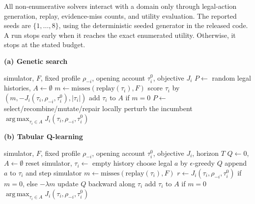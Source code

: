 \documentclass[10pt]{article}
\newcommand{\argmax}{\operatorname*{arg\,max}}
\begin{document}
All non-enumerative solvers interact with a domain only through legal-action
generation, replay, evidence-miss counts, and utility evaluation. The reported
seeds are $\{1,\ldots,8\}$, using the deterministic seeded generator in the
released code. A run stops early when it reaches the exact enumerated utility.
Otherwise, it stops at the stated budget.

\begin{algorithm}[htbp]
\caption{Replay-based best-response solvers for $\hat\tau_i$ under $J_i$}
\label{alg:supp-replay}
\scriptsize
\begin{minipage}[t]{0.49\linewidth}
\textbf{(a) Genetic search}
\begin{algorithmic}[1]
\Require simulator, $F$, fixed profile $\rho_{-i}$, opening account $\tau_i^0$, objective $J_i$
\State $P \gets$ random legal histories, $A \gets \emptyset$
    \State $m \gets \mathrm{misses}(\mathrm{replay}(\tau_i),F)$
    \State score $\tau_i$ by $(m,-J_i(\tau_i,\rho_{-i},\tau_i^0),|\tau_i|)$
    \State add $\tau_i$ to $A$ if $m=0$
  \EndFor
  \State $P \gets$ select/recombine/mutate/repair
  \State locally perturb the incumbent
\EndFor
\State \Return $\argmax_{\tau_i\in A} J_i(\tau_i,\rho_{-i},\tau_i^0)$
\end{algorithmic}
\end{minipage}\hfill
\begin{minipage}[t]{0.49\linewidth}
\textbf{(b) Tabular Q-learning}
\begin{algorithmic}[1]
\Require simulator, $F$, fixed profile $\rho_{-i}$, opening account $\tau_i^0$, objective $J_i$, horizon $T$
\State $Q \gets 0$, $A \gets \emptyset$
  \State reset simulator, $\tau_i \gets$ empty history
    \State choose legal $a$ by $\epsilon$-greedy $Q$
    \State append $a$ to $\tau_i$ and step simulator
  \EndFor
  \State $m \gets \mathrm{misses}(\mathrm{replay}(\tau_i),F)$
  \State $r \gets J_i(\tau_i,\rho_{-i},\tau_i^0)$ if $m=0$, else $-\lambda m$
  \State update $Q$ backward along $\tau_i$
  \State add $\tau_i$ to $A$ if $m=0$
\EndFor
\State \Return $\argmax_{\tau_i\in A} J_i(\tau_i,\rho_{-i},\tau_i^0)$
\end{algorithmic}
\end{minipage}
\end{algorithm}
\end{document}
